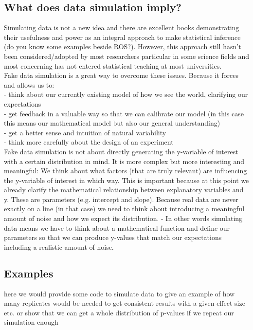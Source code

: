 \documentclass{article}
\begin{document}
\subsection*{What does data simulation imply?}
Simulating data is not a new idea and there are excellent books demonstrating their usefulness and power as an integral approach to make statistical inference (do you know some examples beside ROS?). However, this approach still hasn't been considered/adopted by most researchers particular in some science fields and most concerning has not entered statistical teaching at most universities.\\

Fake data simulation is a great way to overcome these issues. Because it forces and allows us to:\\
    - think about our currently existing model of how we see the world, clarifying our expectations\\
    - get feedback in a valuable way so that we can calibrate our model (in this case this means our mathematical model but also our general understanding)\\
    - get a better sense and intuition of natural variability\\
    - think more carefully about the design of an experiment\\
Fake data simulation is not about directly generating the y-variable of interest with a certain distribution in mind. It is more complex but more interesting and meaningful:
We think about what factors (that are truly relevant) are influencing the y-variable of interest in which way. This is important because at this point we already clarify the mathematical relationship between explanatory variables and y. These are parameters (e.g. intercept and slope). Because real data are never exactly on a line (in that case) we need to think about introducing a meaningful amount of noise and how we expect its distribution. 
- In other words simulating data means we have to think about a mathematical function and define our parameters so that we can produce y-values that match our expectations including a realistic amount of noise.

\subsection*{Examples}
here we would provide some code to simulate data to give an example of how many replicates would be needed to get consistent results with a given effect size etc. or show that we can get a whole distribution of p-values if we repeat our simulation enough\\
\end{document}
